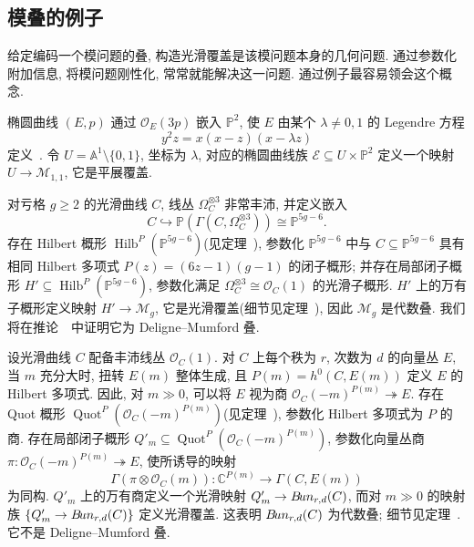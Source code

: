 \subsection{模叠的例子}\label{src:1.6.4-subsection}
给定编码一个模问题的叠, 构造光滑覆盖是该模问题本身的几何问题. 通过参数化附加信息, 将模问题刚性化, 常常就能解决这一问题. 通过例子最容易领会这个概念.
\begin{example}[椭圆曲线的模叠]\label{src:1.6.6}
椭圆曲线 $(E,p)$ 通过 $\mathcal O_E(3p)$ 嵌入 $\mathbb P^2$, 使 $E$ 由某个 $\lambda\neq0,1$ 的 Legendre 方程
\[
y^2z=x(x-z)(x-\lambda z)
\]
定义~\cite[命题 IV.4.6]{Har77}. 令 $U=\mathbb A^1\setminus\{0,1\}$, 坐标为 $\lambda$, 对应的椭圆曲线族 $\mathcal E\subseteq U\times\mathbb P^2$ 定义一个映射 $U\to\mathcal M_{1,1}$, 它是平展覆盖.
\end{example}
\begin{example}[光滑曲线的模叠]\label{src:1.6.7}
对亏格 $g\geq2$ 的光滑曲线 $C$, 线丛 $\Omega_C^{\otimes3}$ 非常丰沛, 并定义嵌入
\[
C\hookrightarrow\mathbb P(\Gamma(C,\Omega_C^{\otimes3}))\cong\mathbb P^{5g-6}.
\]
存在 Hilbert 概形 $\operatorname{Hilb}^P(\mathbb P^{5g-6})$(见定理~), 参数化 $\mathbb P^{5g-6}$ 中与 $C\subseteq\mathbb P^{5g-6}$ 具有相同 Hilbert 多项式 $P(z)=(6z-1)(g-1)$ 的闭子概形; 并存在局部闭子概形 $H'\subseteq\operatorname{Hilb}^P(\mathbb P^{5g-6})$, 参数化满足 $\Omega_C^{\otimes3}\cong\mathcal O_C(1)$ 的光滑子概形. $H'$ 上的万有子概形定义映射 $H'\to\mathcal M_g$, 它是光滑覆盖(细节见定理~), 因此 $\mathcal M_g$ 是代数叠. 我们将在推论~~中证明它为 Deligne--Mumford 叠.
\end{example}
\begin{example}[向量丛的模叠]\label{src:1.6.8}
设光滑曲线 $C$ 配备丰沛线丛 $\mathcal O_C(1)$. 对 $C$ 上每个秩为 $r$, 次数为 $d$ 的向量丛 $E$, 当 $m$ 充分大时, 扭转 $E(m)$ 整体生成, 且 $P(m)=h^0(C,E(m))$ 定义 $E$ 的 Hilbert 多项式. 因此, 对 $m\gg0$, 可以将 $E$ 视为商 $\mathcal O_C(-m)^{P(m)}\twoheadrightarrow E$. 存在 Quot 概形 $\operatorname{Quot}^P(\mathcal O_C(-m)^{P(m)})$(见定理~), 参数化 Hilbert 多项式为 $P$ 的商. 存在局部闭子概形 $Q'_m\subseteq\operatorname{Quot}^P(\mathcal O_C(-m)^{P(m)})$, 参数化向量丛商 $\pi:\mathcal O_C(-m)^{P(m)}\twoheadrightarrow E$, 使所诱导的映射
\[
\Gamma(\pi\otimes\mathcal O_C(m)):\mathbb C^{P(m)}\longrightarrow\Gamma(C,E(m))
\]
为同构. $Q'_m$ 上的万有商定义一个光滑映射 $Q'_m\to B\!un_{r,d}(C)$, 而对 $m\gg0$ 的映射族 $\{Q'_m\to B\!un_{r,d}(C)\}$ 定义光滑覆盖. 这表明 $B\!un_{r,d}(C)$ 为代数叠; 细节见定理~. 它不是 Deligne--Mumford 叠.
\end{example}

